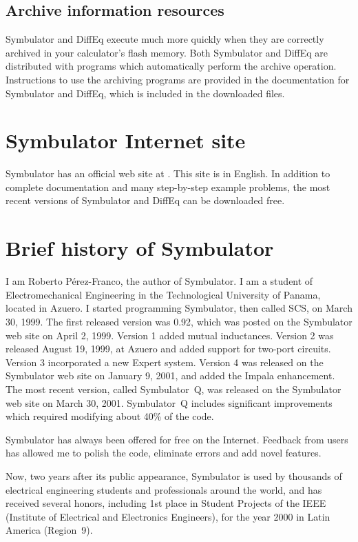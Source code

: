 \subsection{Archive information resources}

Symbulator and DiffEq execute much more quickly when they are
correctly archived in your calculator's flash memory. Both
Symbulator and DiffEq are distributed with programs which
automatically perform the archive operation. Instructions to use the
archiving programs are provided in the documentation for Symbulator
and DiffEq, which is included in the downloaded files.

\section{Symbulator Internet site}

Symbulator has an official web site at
. This site is in English. In
addition to complete documentation and many step-by-step example
problems, the most recent versions of Symbulator and DiffEq can be
downloaded free.

\section{Brief history of Symbulator}

I am Roberto P\'erez-Franco, the author of Symbulator. I am a
student of Electromechanical Engineering in the Technological
University of Panama, located in Azuero. I started programming
Symbulator, then called SCS, on March 30, 1999. The first released
version was 0.92, which was posted on the Symbulator web site on
April 2, 1999. Version 1 added mutual inductances. Version 2 was
released August 19, 1999, at Azuero and added support for two-port
circuits. Version 3 incorporated a new Expert system. Version 4 was
released on the Symbulator web site on January 9, 2001, and added
the Impala enhancement. The most recent version, called
Symbulator~Q, was released on the Symbulator web site on March 30,
2001. Symbulator~Q includes significant improvements which required
modifying about 40\% of the code.

Symbulator has always been offered for free on the Internet.
Feedback from users has allowed me to polish the code, eliminate
errors and add novel features.

Now, two years after its public appearance, Symbulator is used by
thousands of electrical engineering students and professionals
around the world, and has received several honors, including 1st
place in Student Projects of the IEEE (Institute of Electrical and
Electronics Engineers), for the year 2000 in Latin America
(Region~9).

